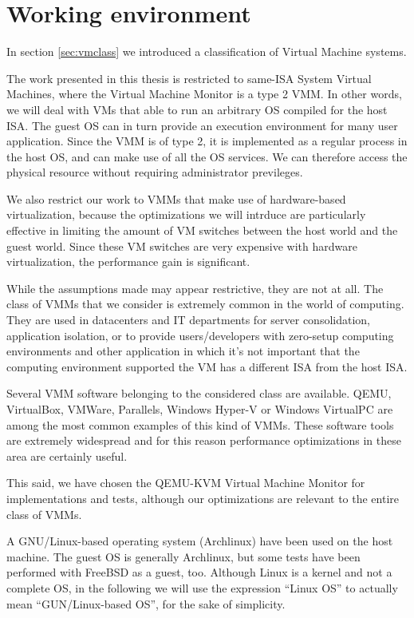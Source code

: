 \chapter{Working environment}
\label{chap:env}

In section \ref{sec:vmclass} we introduced a classification of Virtual Machine systems.

The work presented in this thesis is restricted to same-ISA System Virtual Machines, where the Virtual Machine Monitor is a type 2 VMM.
In other words, we will deal with VMs that able to run an arbitrary OS compiled for the host ISA. The guest OS can in turn provide an 
execution environment for many user application.
Since the VMM is of type 2, it is implemented as a regular process in the host OS, and can make use of all the OS services.
We can therefore access the physical resource without requiring administrator previleges.

We also restrict our work to VMMs that make use of hardware-based virtualization, because the optimizations we will intrduce are
particularly effective in limiting the amount of VM switches between the host world and the guest world. Since these VM switches
are very expensive with hardware virtualization, the performance gain is significant.

While the assumptions made may appear restrictive, they are not at all. The class of VMMs that we consider is extremely 
common in the world of computing. They are used in datacenters and IT departments for server consolidation, 
application isolation, or to provide users/developers with zero-setup computing environments and other application in which it's
not important that the computing environment supported the VM has a different ISA from the host ISA.

\vspace{0.5cm}

Several VMM software belonging to the considered class are available. QEMU, VirtualBox, VMWare, Parallels, Windows
Hyper-V or Windows VirtualPC are among the most common examples of this kind of VMMs. These software tools are extremely widespread
and for this reason performance optimizations in these area are certainly useful.

This said, we have chosen the QEMU-KVM Virtual Machine Monitor for implementations and tests, although our optimizations are
relevant to the entire class of VMMs.

A GNU/Linux-based operating system (Archlinux) have been used on the host machine. The guest OS is generally Archlinux, but 
some tests have been performed with FreeBSD as a guest, too. Although Linux is a kernel and not a complete OS, in the following we 
will use  the expression ``Linux OS'' to actually mean ``GUN/Linux-based OS'', for the sake of simplicity.


